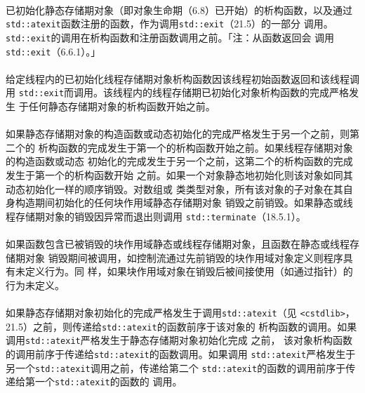 \paragraph{}
已初始化静态存储期对象（即对象生命期（6.8）已开始）的析构函数，以及通过
\texttt{std::atexit}函数注册的函数，作为调用\texttt{std::exit}（21.5）的一部分
调用。\texttt{std::exit}的调用在析构函数和注册函数调用之前。「注：从函数返回会
调用\texttt{std::exit}（6.6.1）。」

\paragraph{}
给定线程内的已初始化线程存储期对象析构函数因该线程初始函数返回和该线程调用
\texttt{std::exit}而调用。该线程内的线程存储期已初始化对象析构函数的完成严格发生
于任何静态存储期对象的析构函数开始之前。

\paragraph{}
如果静态存储期对象的构造函数或动态初始化的完成严格发生于另一个之前，则第二个的
析构函数的完成发生于第一个的析构函数开始之前。如果线程存储期对象的构造函数或动态
初始化的完成发生于另一个之前，这第二个的析构函数的完成发生于第一个的析构函数开始
之前。如果一个对象静态地初始化则该对象如同其动态初始化一样的顺序销毁。对数组或
类类型对象，所有该对象的子对象在其自身构造期间初始化的任何块作用域静态存储期对象
销毁之前销毁。如果静态或线程存储期对象的销毁因异常而退出则调用
\texttt{std::terminate}（18.5.1）。

\paragraph{}
如果函数包含已被销毁的块作用域静态或线程存储期对象，且函数在静态或线程存储期对象
销毁期间被调用，如控制流通过先前销毁的块作用域对象定义则程序具有未定义行为。同
样，如果块作用域对象在销毁后被间接使用（如通过指针）的行为未定义。

\paragraph{}
如果静态存储期对象初始化的完成严格发生于调用\texttt{std::atexit}（见
\texttt{<cstdlib>}，21.5）之前，则传递给\texttt{std::atexit}的函数前序于该对象的
析构函数的调用。如果调用\texttt{std::atexit}严格发生于静态存储期对象初始化完成
之前，
该对象析构函数的调用前序于传递给\texttt{std::atexit}的函数调用。如果调用
\texttt{std::atexit}严格发生于另一个\texttt{std::atexit}调用之前，传递给第二个
\texttt{std::atexit}的函数的调用前序于传递给第一个\texttt{std::atexit}的函数的
调用。

